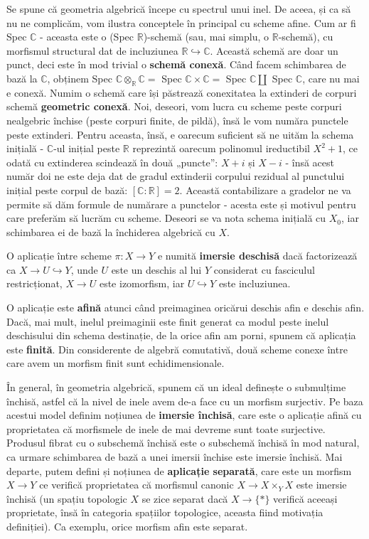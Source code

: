 \documentclass[13pt,openany]{book}
\begin{document}
Se spune că geometria algebrică începe cu spectrul unui inel. De aceea, și ca să nu ne complicăm, vom ilustra conceptele în principal cu scheme afine. Cum ar fi Spec $\mathbb{C}$ - aceasta este o (Spec $\mathbb{R}$)-schemă (sau, mai simplu, o $\mathbb{R}$-schemă), cu morfismul structural dat de incluziunea $\mathbb{R}  \hookrightarrow \mathbb{C}$. Această schemă are doar un punct, deci este în mod trivial o {\bf schemă conexă}. Când facem schimbarea de bază la $\mathbb{C}$, obținem Spec $\mathbb{C} \otimes_{\mathbb{R}} \mathbb{C} =$ Spec $\mathbb{C} \times \mathbb{C} =$ Spec $\mathbb{C} \coprod$ Spec $\mathbb{C}$, care nu mai e conexă. Numim o schemă care își păstrează conexitatea la extinderi de corpuri schemă {\bf geometric conexă}. Noi, deseori, vom lucra cu scheme peste corpuri nealgebric închise (peste corpuri finite, de pildă), însă le vom număra punctele peste extinderi. Pentru aceasta, însă, e oarecum suficient să ne uităm la schema inițială - $\mathbb{C}$-ul inițial peste $\mathbb{R}$ reprezintă oarecum polinomul ireductibil $X^2+1$, ce odată cu extinderea scindează în două „puncte”: $X+i$ și $X-i$ - însă acest număr doi ne este deja dat de gradul extinderii corpului rezidual al punctului inițial peste corpul de bază: $[\mathbb{C}:\mathbb{R}]=2$. Această contabilizare a gradelor ne va permite să dăm formule de numărare a punctelor - acesta este și motivul pentru care preferăm să lucrăm cu scheme. Deseori se va nota schema inițială cu $X_0$, iar schimbarea ei de bază la închiderea algebrică cu $X$.

O aplicație între scheme $\pi: X \to Y$ e numită {\bf imersie deschisă} dacă factorizează ca $X \to U \hookrightarrow Y$, unde $U$ este un deschis al lui $Y$ considerat cu fasciculul restricționat, $X \to U$ este izomorfism, iar $U \hookrightarrow Y$ este incluziunea.

O aplicație este {\bf afină} atunci când preimaginea oricărui deschis afin e deschis afin. Dacă, mai mult, inelul preimaginii este finit generat ca modul peste inelul deschisului din schema destinație, de la orice afin am porni, spunem că aplicația este {\bf finită}. Din considerente de algebră comutativă, două scheme conexe între care avem un morfism finit sunt echidimensionale.

În general, în geometria algebrică, spunem că un ideal definește o submulțime închisă, astfel că la nivel de inele avem de-a face cu un morfism surjectiv. Pe baza acestui model definim noțiunea de {\bf imersie închisă}, care este o aplicație afină cu proprietatea că morfismele de inele de mai devreme sunt toate surjective. Produsul fibrat cu o subschemă închisă este o subschemă închisă în mod natural, ca urmare schimbarea de bază a unei imersii închise este imersie închisă. Mai departe, putem defini și noțiunea de {\bf aplicație separată}, care este un morfism $X \to Y$ ce verifică proprietatea că morfismul canonic $X \to X \times_Y X$ este imersie închisă (un spațiu topologic $X$ se zice separat dacă $X \to \{*\}$ verifică aceeași proprietate, însă în categoria spațiilor topologice, aceasta fiind motivația definiției). Ca exemplu, orice morfism afin este separat.
\end{document}
